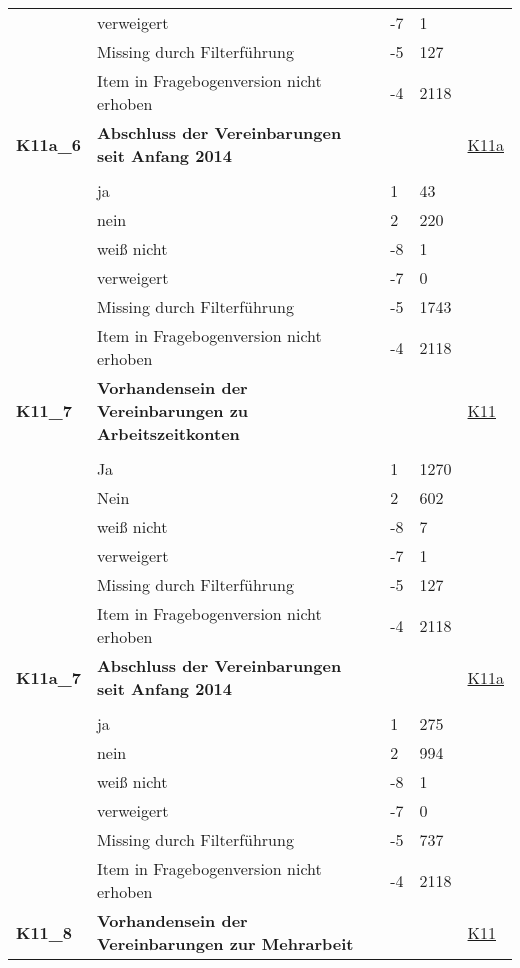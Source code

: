 \begin{longtable}{| L{2.5cm} | L{8.25cm}| C{1.5cm} | R{1.25cm} | C{2.25cm} |  }
   & verweigert & -7 & 1 &  \\ 
   & Missing durch Filterführung & -5 & 127 &  \\ 
   & Item in Fragebogenversion nicht erhoben & -4 & 2118 &  \\ 
   \midrule
\textbf{K11a\_6}\label{var:suf:K11a:6} & \textbf{Abschluss der Vereinbarungen seit Anfang 2014} &  &  & \hyperref[K11a]{K11a} \\ 
   &  &  &  &  \\ 
   & ja & 1 & 43 &  \\ 
   & nein & 2 & 220 &  \\ 
   & weiß nicht & -8 & 1 &  \\ 
   & verweigert & -7 & 0 &  \\ 
   & Missing durch Filterführung & -5 & 1743 &  \\ 
   & Item in Fragebogenversion nicht erhoben & -4 & 2118 &  \\ 
   \midrule
\textbf{K11\_7}\label{var:suf:K11:7} & \textbf{Vorhandensein der Vereinbarungen zu Arbeitszeitkonten} &  &  & \hyperref[K11]{K11} \\ 
   &  &  &  &  \\ 
   & Ja & 1 & 1270 &  \\ 
   & Nein & 2 & 602 &  \\ 
   & weiß nicht & -8 & 7 &  \\ 
   & verweigert & -7 & 1 &  \\ 
   & Missing durch Filterführung & -5 & 127 &  \\ 
   & Item in Fragebogenversion nicht erhoben & -4 & 2118 &  \\ 
   \midrule
\textbf{K11a\_7}\label{var:suf:K11a:7} & \textbf{Abschluss der Vereinbarungen seit Anfang 2014} &  &  & \hyperref[K11a]{K11a} \\ 
   &  &  &  &  \\ 
   & ja & 1 & 275 &  \\ 
   & nein & 2 & 994 &  \\ 
   & weiß nicht & -8 & 1 &  \\ 
   & verweigert & -7 & 0 &  \\ 
   & Missing durch Filterführung & -5 & 737 &  \\ 
   & Item in Fragebogenversion nicht erhoben & -4 & 2118 &  \\ 
   \midrule
\textbf{K11\_8}\label{var:suf:K11:8} & \textbf{Vorhandensein der Vereinbarungen zur Mehrarbeit} &  &  & \hyperref[K11]{K11} \\ 

\end{longtable}
